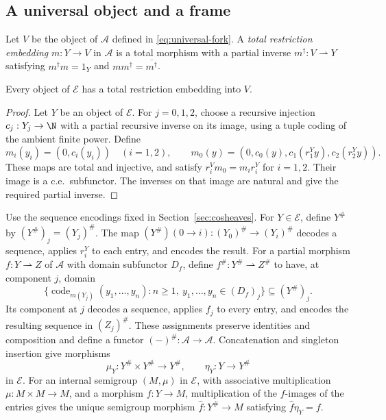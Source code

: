 \subsection{A universal object and a frame}

Let $V$ be the object of $\mathcal A$ defined in
\eqref{eq:universal-fork}.
A \emph{total restriction embedding} $m:Y\to V$ in $\mathcal A$
is a total morphism with a partial inverse
$m^\dagger:V\rightharpoonup Y$ satisfying
$m^\dagger m=1_Y$ and $mm^\dagger=\overline{m^\dagger}$.

\begin{lemma}\label{lem:fork-dominance}
Every object of $\mathcal E$ has a total restriction embedding
into $V$.
\end{lemma}
\begin{proof}
Let $Y$ be an object of $\mathcal E$. For $j=0,1,2$, choose a
recursive injection $c_j:Y_j\to\N$
with a partial recursive inverse on its image, using a tuple
coding of the ambient finite power. Define
\[
 m_i(y_i)=(0,c_i(y_i))\quad(i=1,2),\qquad
 m_0(y)=(0,c_0(y),c_1(r_1^Yy),c_2(r_2^Yy)).
\]
These maps are total and injective, and satisfy
$r_i^Vm_0=m_i r_i^Y$ for $i=1,2$.
Their image is a c.e.\ subfunctor. The inverses on that image
are natural and give the required partial inverse.
\end{proof}

Use the sequence encodings fixed in Section~\ref{sec:cosheaves}.
For $Y\in\mathcal E$, define $Y^\#$ by
$(Y^\#)_j=(Y_j)^\#$.
The map $(Y^\#)(0\to i):(Y_0)^\#\to(Y_i)^\#$ decodes a sequence,
applies $r_i^Y$ to each entry, and encodes the result.
For a partial morphism $f:Y\rightharpoonup Z$ of $\mathcal A$
with domain subfunctor $D_f$, define
$f^\#:Y^\#\rightharpoonup Z^\#$ to have, at component $j$, domain
\[
 \{\operatorname{code}_{m(Y_j)}(y_1,\ldots,y_n):
          n\ge1,\ y_1,\ldots,y_n\in(D_f)_j\}\subseteq(Y^\#)_j.
\]
Its component at $j$ decodes a sequence, applies $f_j$ to every
entry, and encodes the resulting sequence in $(Z_j)^\#$.
These assignments preserve identities and composition and define
a functor $(-)^\#:\mathcal A\to\mathcal A$.
Concatenation and singleton insertion give morphisms
\[
 \mu_Y:Y^\#\times Y^\#\to Y^\#,
 \qquad \eta_Y:Y\to Y^\#
\]
in $\mathcal E$.
For an internal semigroup $(M,\mu)$ in $\mathcal E$, with
associative multiplication $\mu:M\times M\to M$, and a morphism
$f:Y\to M$, multiplication of the $f$-images of the entries gives
the unique semigroup morphism $\widehat f:Y^\#\to M$ satisfying
$\widehat f\eta_Y=f$.

